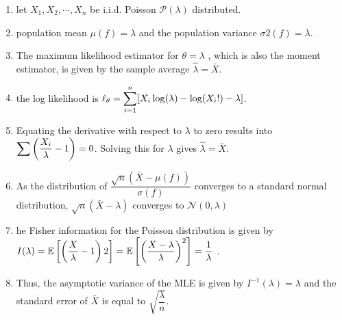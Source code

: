 \begin{enumerate}
    \item let $X_1 , X_2, \cdots , X_n$ be i.i.d. Poisson $\mathcal{P}(\lambda)$ distributed.
    \hfill \cite{statistics/book/Statistics-for-Data-Scientists/Maurits-Kaptein}

    \item population mean $\mu ( f ) = \lambda $ and the population variance $\sigma 2( f ) = \lambda $.
    \hfill \cite{statistics/book/Statistics-for-Data-Scientists/Maurits-Kaptein}

    \item The maximum likelihood estimator for $\theta = \lambda$ , which is also the moment estimator, is given by the sample average $\hat{\lambda} = \bar{X}$.
    \hfill \cite{statistics/book/Statistics-for-Data-Scientists/Maurits-Kaptein}

    \item  the log likelihood is $\ell _\theta = \displaystyle\sum^n _{i=1}[X_i \log(\lambda ) - \log(X_i !) - \lambda ]$.
    \hfill \cite{statistics/book/Statistics-for-Data-Scientists/Maurits-Kaptein}

    \item Equating the derivative with respect to $\lambda $ to zero results into $\displaystyle\sum \left(\dfrac{X_i}{\lambda} - 1\right) = 0$.
    Solving this for $\lambda $ gives $\hat{\lambda} = \bar{X}$.
    \hfill \cite{statistics/book/Statistics-for-Data-Scientists/Maurits-Kaptein}

    \item As the distribution of $\dfrac{\sqrt{n}( \bar{X} - \mu ( f ))}{\sigma ( f )}$ converges to a standard normal distribution, $\sqrt{n}( \bar{X} - \lambda )$ converges to $\mathcal{N} (0, \lambda )$
    \hfill \cite{statistics/book/Statistics-for-Data-Scientists/Maurits-Kaptein}

    \item he Fisher information for the Poisson distribution is given by $I (\lambda ) = \mathbb{E}\left[\left(\dfrac{X}{\lambda} - 1\right)2\right]=  \mathbb{E}\left[\left(\dfrac{X - \lambda}{\lambda}\right)^2\right] = \dfrac{1}{\lambda} $ .
    \hfill \cite{statistics/book/Statistics-for-Data-Scientists/Maurits-Kaptein}

    \item Thus, the asymptotic variance of the MLE is given by $I ^{-1}(\lambda ) = \lambda $ and the standard error of $\bar{X}$ is equal to $\sqrt{\dfrac{\lambda}{n}}$.
    \hfill \cite{statistics/book/Statistics-for-Data-Scientists/Maurits-Kaptein}
\end{enumerate}





